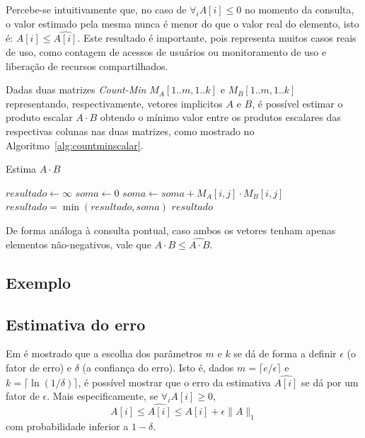 Percebe-se intuitivamente que, no caso de $\forall_i A[i] \leq 0$ no momento da consulta, o valor estimado pela mesma nunca é menor do que o valor real do elemento, isto é: $A[i] \leq \widehat{A[i]}$. Este resultado é importante, pois representa muitos casos reais de uso, como contagem de acessos de usuários ou monitoramento de uso e liberação de recursos compartilhados.

Dadas duas matrizes \emph{Count-Min} $M_A[1..m, 1..k]$ e $M_B[1..m, 1..k]$ representando, respectivamente, vetores implicitos $A$ e $B$, é possível estimar o produto escalar $A \cdot B$ obtendo o mínimo valor entre os produtos escalares das respectivas colunas nas duas matrizes, como mostrado no Algoritmo~\ref{alg:countminscalar}.

\begin{algorithm}
\linespread{1}\selectfont
\caption{Estima $A \cdot B$}
\label{alg:countminscalar}
\begin{algorithmic}[1]
    \State $resultado \gets \infty$ 
        \State $soma \gets 0$ 
            \State $soma \gets soma + M_A[i, j] \cdot M_B[i, j]$
        \EndFor
        \State $resultado = \min(resultado, soma)$
	\EndFor
	\Return $resultado$
\EndFunction
\end{algorithmic}
\end{algorithm}

De forma análoga à consulta pontual, caso ambos os vetores tenham apenas elementos não-negativos, vale que $A \cdot B \leq \widehat{A \cdot B}$.

\subsection{Exemplo}\label{sec:countmin:example}


\subsection{Estimativa do erro}

Em \cite{cormode2005improved} é mostrado que a escolha dos parâmetros $m$ e $k$ se dá de forma a definir $\epsilon$ (o fator de erro) e $\delta$ (a confiança do erro). Isto é, dados $m = \lceil e/\epsilon \rceil$ e $k = \lceil \ln(1/\delta) \rceil$, é possível mostrar que o erro da estimativa $\widehat{A[i]}$ se dá por um fator de $\epsilon$. Mais especificamente, se $\forall_i A[i] \geq 0$,
\[
A[i] \leq \widehat{A[i]} \leq A[i] + \epsilon \lVert A \rVert_1
\]
com probabilidade inferior a $1 - \delta$.

